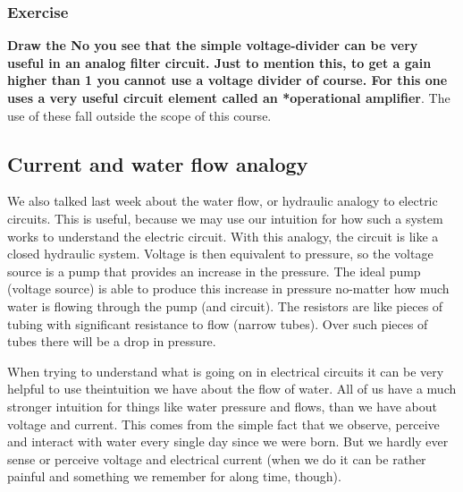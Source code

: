 \documentclass[a4paper]{scrartcl}
\begin{document}
\subsubsection{Exercise}
\label{sec-1-1-1}
\begin{center}
\end{center}
\textbf{Draw the
No you see that the simple voltage-divider can be very useful in an analog filter circuit. Just to mention this, to get a gain higher than 1 you cannot use a voltage divider of course. For this one uses a very useful circuit element called an *operational amplifier}. The use of these fall outside the scope of this course.

\subsection{Current and water flow analogy}
\label{sec-1-2}
We also talked last week about the water flow, or hydraulic analogy to electric circuits. This is useful, because we may use our intuition for how such a system works to understand the electric circuit. 
With this analogy, the circuit is like a closed hydraulic system. Voltage is then equivalent to pressure, so the voltage source is a pump that provides an increase in the pressure. The ideal pump (voltage source) is able to produce this increase in pressure no-matter how much water is flowing through the pump (and circuit). The resistors are like pieces of tubing with significant resistance to flow (narrow tubes). Over such pieces of tubes there will be a drop in pressure.  

When trying to understand what is going on in electrical circuits it can be very helpful to use theintuition we have about the flow of water. All of us have a much stronger intuition for things like water pressure and flows, than we have about voltage and current. This comes from the simple fact that we observe, perceive and interact with water every single day since we were born. But we hardly ever sense or perceive voltage and electrical current (when we do it can be rather painful and something we remember for along time, though). 
\end{document}
